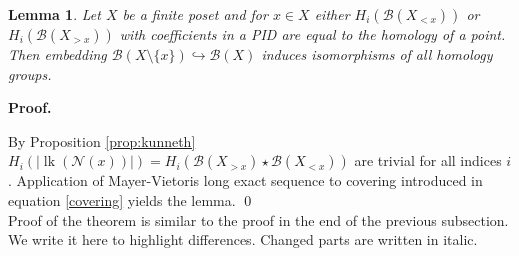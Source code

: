 \documentclass[english,12pt]{article}
\newcounter{stmcounter}[section]
\numberwithin{equation}{section}
\newtheorem{lemma}[stmcounter]{Lemma}
\theoremstyle{definition}
\theoremstyle{remark}
\newenvironment{pf}{\noindent\textbf{Proof.}}{\qed}
\begin{document}
\begin{lemma}
  \label{lem:trivialties}
  Let $X$ be a finite poset and for $x \in X$ either $H_i(\mathcal{B}(X_{< x}))$ or $H_i(\mathcal{B}(X_{> x}))$ with coefficients in a PID are equal to the homology of a point. Then embedding $\mathcal{B}(X \setminus \{x\}) \hookrightarrow \mathcal{B}(X)$ induces isomorphisms of all homology groups.
\end{lemma}

\begin{pf} ~ \par
  By Proposition \ref{prop:kunneth} $H_i(\left|\operatorname{lk}(\mathcal{N}(x))\right|) = H_i(\mathcal{B}(X_{>x}) \star \mathcal{B}(X_{<x}))$ are trivial for all indices $i$.
  Application of Mayer-Vietoris long exact sequence to covering introduced in equation \eqref{covering} yields the lemma.
\end{pf}\\

Proof of the theorem is similar to the proof in the end of the previous subsection. We write it here to highlight differences. Changed parts are written in italic.\\
\end{document}
